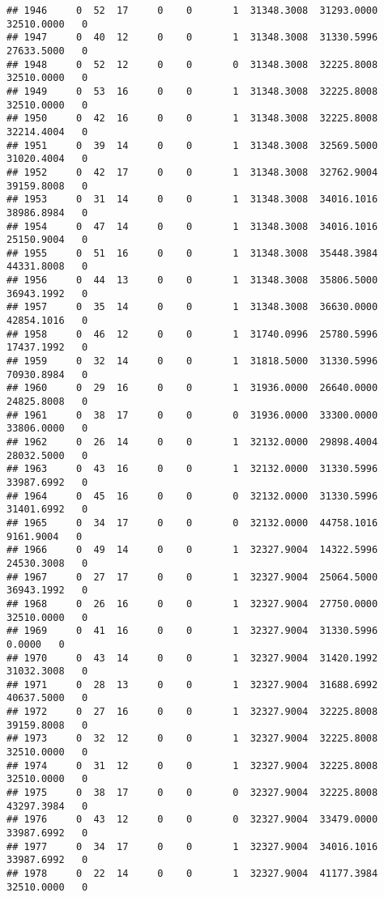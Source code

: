 \documentclass[
]{article}
\begin{document}
\begin{enumerate}
\begin{verbatim}
## 1946     0  52  17     0    0       1  31348.3008  31293.0000  32510.0000   0
## 1947     0  40  12     0    0       1  31348.3008  31330.5996  27633.5000   0
## 1948     0  52  12     0    0       0  31348.3008  32225.8008  32510.0000   0
## 1949     0  53  16     0    0       1  31348.3008  32225.8008  32510.0000   0
## 1950     0  42  16     0    0       1  31348.3008  32225.8008  32214.4004   0
## 1951     0  39  14     0    0       1  31348.3008  32569.5000  31020.4004   0
## 1952     0  42  17     0    0       1  31348.3008  32762.9004  39159.8008   0
## 1953     0  31  14     0    0       1  31348.3008  34016.1016  38986.8984   0
## 1954     0  47  14     0    0       1  31348.3008  34016.1016  25150.9004   0
## 1955     0  51  16     0    0       1  31348.3008  35448.3984  44331.8008   0
## 1956     0  44  13     0    0       1  31348.3008  35806.5000  36943.1992   0
## 1957     0  35  14     0    0       1  31348.3008  36630.0000  42854.1016   0
## 1958     0  46  12     0    0       1  31740.0996  25780.5996  17437.1992   0
## 1959     0  32  14     0    0       1  31818.5000  31330.5996  70930.8984   0
## 1960     0  29  16     0    0       1  31936.0000  26640.0000  24825.8008   0
## 1961     0  38  17     0    0       0  31936.0000  33300.0000  33806.0000   0
## 1962     0  26  14     0    0       1  32132.0000  29898.4004  28032.5000   0
## 1963     0  43  16     0    0       1  32132.0000  31330.5996  33987.6992   0
## 1964     0  45  16     0    0       0  32132.0000  31330.5996  31401.6992   0
## 1965     0  34  17     0    0       0  32132.0000  44758.1016   9161.9004   0
## 1966     0  49  14     0    0       1  32327.9004  14322.5996  24530.3008   0
## 1967     0  27  17     0    0       1  32327.9004  25064.5000  36943.1992   0
## 1968     0  26  16     0    0       1  32327.9004  27750.0000  32510.0000   0
## 1969     0  41  16     0    0       1  32327.9004  31330.5996      0.0000   0
## 1970     0  43  14     0    0       1  32327.9004  31420.1992  31032.3008   0
## 1971     0  28  13     0    0       1  32327.9004  31688.6992  40637.5000   0
## 1972     0  27  16     0    0       1  32327.9004  32225.8008  39159.8008   0
## 1973     0  32  12     0    0       1  32327.9004  32225.8008  32510.0000   0
## 1974     0  31  12     0    0       1  32327.9004  32225.8008  32510.0000   0
## 1975     0  38  17     0    0       0  32327.9004  32225.8008  43297.3984   0
## 1976     0  43  12     0    0       0  32327.9004  33479.0000  33987.6992   0
## 1977     0  34  17     0    0       1  32327.9004  34016.1016  33987.6992   0
## 1978     0  22  14     0    0       1  32327.9004  41177.3984  32510.0000   0

\end{verbatim}
\end{enumerate}
\end{document}

